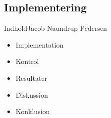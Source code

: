 \subsection{Implementering}


\begin{frame}{Indhold}{Jacob Naundrup Pedersen}
 \vfill\vfill\centering  
\begin{itemize}
	
\item Implementation \vspace{2mm}
\item Kontrol \vspace{2mm}
\item Resultater \vspace{2mm}
\item Diskussion \vspace{2mm}
\item Konklusion \vspace{2mm}
\end{itemize}
 \vfill\vfill
\end{frame}


